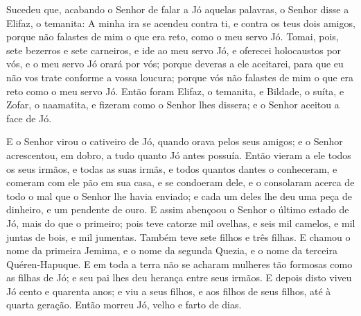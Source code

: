 Sucedeu que, acabando o Senhor de falar a Jó aquelas palavras, o
Senhor disse a Elifaz, o temanita: A minha ira se acendeu contra ti,
e contra os teus dois amigos, porque não falastes de mim o que era
reto, como o meu servo Jó. Tomai, pois, sete bezerros e sete
carneiros, e ide ao meu servo Jó, e oferecei holocaustos por vós, e
o meu servo Jó orará por vós; porque deveras a ele aceitarei, para
que eu não vos trate conforme a vossa loucura; porque vós não
falastes de mim o que era reto como o meu servo Jó. Então foram
Elifaz, o temanita, e Bildade, o suíta, e Zofar, o naamatita, e
fizeram como o Senhor lhes dissera; e o Senhor aceitou a face de Jó.

E o Senhor virou o cativeiro de Jó, quando orava pelos seus
amigos; e o Senhor acrescentou, em dobro, a tudo quanto Jó antes
possuía. Então vieram a ele todos os seus irmãos, e todas as
suas irmãs, e todos quantos dantes o conheceram, e comeram com ele
pão em sua casa, e se condoeram dele, e o consolaram acerca de todo
o mal que o Senhor lhe havia enviado; e cada um deles lhe deu uma
peça de dinheiro, e um pendente de ouro. E assim abençoou o
Senhor o último estado de Jó, mais do que o primeiro; pois teve
catorze mil ovelhas, e seis mil camelos, e mil juntas de bois, e mil
jumentas. Também teve sete filhos e três filhas. E
chamou o nome da primeira Jemima, e o nome da segunda Quezia, e o
nome da terceira Quéren-Hapuque. E em toda a terra não se
acharam mulheres tão formosas como as filhas de Jó; e seu pai lhes
deu herança entre seus irmãos. E depois disto viveu Jó cento
e quarenta anos; e viu a seus filhos, e aos filhos de seus filhos,
até à quarta geração. Então morreu Jó, velho e farto de dias.

